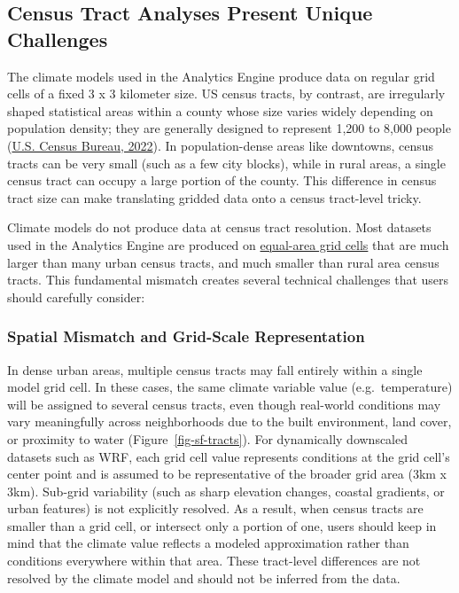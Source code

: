 \documentclass[
  letterpaper,
  DIV=11,
  numbers=noendperiod]{scrartcl}
\begin{document}
\subsection{Census Tract Analyses Present Unique
Challenges}\label{census-tract-analyses-present-unique-challenges}

The climate models used in the Analytics Engine produce data on regular
grid cells of a fixed 3 x 3 kilometer size. US census tracts, by
contrast, are irregularly shaped statistical areas within a county whose
size varies widely depending on population density; they are generally
designed to represent 1,200 to 8,000 people
(\href{https://www.census.gov/programs-surveys/geography/about/glossary.html\#par_textimage_13}{U.S.
Census Bureau, 2022}). In population-dense areas like downtowns, census
tracts can be very small (such as a few city blocks), while in rural
areas, a single census tract can occupy a large portion of the county.
This difference in census tract size can make translating gridded data
onto a census tract-level tricky.

Climate models do not produce data at census tract resolution. Most
datasets used in the Analytics Engine are produced on
\href{https://climateestimate.net/content/gridded-data.html\#:~:text=Gridded\%20data\%20products\%20are\%20a\%20combination\%20of,the\%20entire\%20globe\%20or\%20a\%20specific\%20region.}{equal-area
grid cells} that are much larger than many urban census tracts, and much
smaller than rural area census tracts. This fundamental mismatch creates
several technical challenges that users should carefully consider:

\subsubsection{Spatial Mismatch and Grid-Scale
Representation}\label{spatial-mismatch-and-grid-scale-representation}

In dense urban areas, multiple census tracts may fall entirely within a
single model grid cell. In these cases, the same climate variable value
(e.g.~temperature) will be assigned to several census tracts, even
though real-world conditions may vary meaningfully across neighborhoods
due to the built environment, land cover, or proximity to water
(Figure~\ref{fig-sf-tracts}). For dynamically downscaled datasets such
as WRF, each grid cell value represents conditions at the grid cell's
center point and is assumed to be representative of the broader grid
area (3km x 3km). Sub-grid variability (such as sharp elevation changes,
coastal gradients, or urban features) is not explicitly resolved. As a
result, when census tracts are smaller than a grid cell, or intersect
only a portion of one, users should keep in mind that the climate value
reflects a modeled approximation rather than conditions everywhere
within that area. These tract-level differences are not resolved by the
climate model and should not be inferred from the data.
\end{document}
